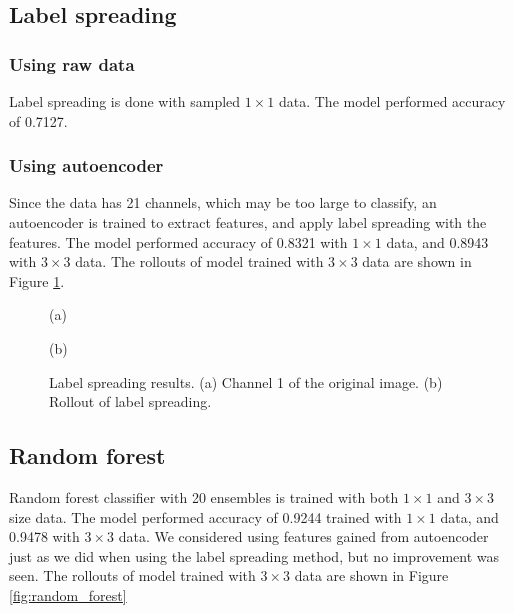 \documentclass{article}
\begin{document}
    \subsection{Label spreading} \label{sec:label}
        \subsubsection{Using raw data}
            Label spreading is done with sampled $1\times 1$ data.
            The model performed accuracy of 0.7127.

        \subsubsection{Using autoencoder} \label{sec:aecomb}
            Since the data has 21 channels,
            which may be too large to classify,
            an autoencoder is trained to extract features,
            and apply label spreading with the features.
            The model performed accuracy of 0.8321 with $1\times 1$ data,
            and 0.8943 with $3\times 3$ data.
            The rollouts of model trained with $3\times 3$ data
            are shown in Figure \ref{fig:label}.

            \begin{figure}[ht]
                \centering
                \begin{minipage}{0.49\hsize}
                    \centering
                    \caption*{(a)}
                \end{minipage}
                \begin{minipage}{0.49\hsize}
                    \centering
                    \caption*{(b)}
                \end{minipage}
                \caption{
                    Label spreading results.
                    (a) Channel 1 of the original image.
                    (b) Rollout of label spreading.
                }
                \label{fig:label}
            \end{figure}

    \subsection{Random forest} \label{sec:random}
        Random forest classifier with 20 ensembles is trained with
        both $1\times 1$ and $3\times 3$ size data.
        The model performed accuracy of 0.9244 trained with $1\times 1$ data,
        and 0.9478 with $3\times 3$ data.
        We considered using features gained from autoencoder just as
        we did when using the label spreading method,
        but no improvement was seen.
        The rollouts of model trained with $3\times 3$ data
        are shown in Figure \ref{fig:random_forest}
\end{document}
